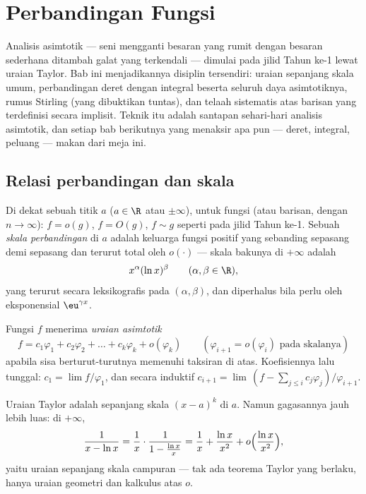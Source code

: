 \chapter{Perbandingan Fungsi}\label{ch:b2:comparison}

Analisis asimtotik --- seni mengganti besaran yang rumit
dengan besaran sederhana ditambah galat yang terkendali --- dimulai pada
jilid Tahun ke-1 lewat uraian Taylor. Bab ini menjadikannya disiplin
tersendiri: uraian sepanjang skala umum, perbandingan deret dengan
integral beserta seluruh daya asimtotiknya, rumus Stirling (yang
dibuktikan tuntas), dan telaah sistematis atas barisan yang terdefinisi
secara implisit. Teknik itu adalah santapan sehari-hari analisis
asimtotik, dan setiap bab berikutnya yang menaksir apa pun ---
deret, integral, peluang --- makan dari meja ini.

\section{Relasi perbandingan dan skala}

\begin{definition}\label{def:b2:comparison:landau}
Di dekat sebuah titik $a$ ($a \in \R$ atau $\pm\infty$), untuk fungsi
(atau barisan, dengan $n \to \infty$): $f = o(g)$, $f = O(g)$, $f \sim g$
seperti pada jilid Tahun ke-1. Sebuah \emph{skala
perbandingan} di $a$ adalah keluarga fungsi
positif yang sebanding sepasang demi sepasang dan terurut total oleh
$o(\cdot)$ --- skala bakunya di $+\infty$ adalah
\[
x^{\alpha} (\ln x)^{\beta}
\qquad (\alpha, \beta \in \R),
\]
yang terurut secara leksikografis pada $(\alpha, \beta)$, dan diperhalus
bila perlu oleh eksponensial $\eu^{\gamma x}$.
\end{definition}

\begin{definition}\label{def:b2:comparison:expansion}
Fungsi $f$ menerima \emph{uraian asimtotik}
\[
f = c_1 \varphi_1 + c_2\varphi_2 + \dots + c_k \varphi_k +
o(\varphi_k)
\qquad (\varphi_{i+1} = o(\varphi_i) \text{ pada skalanya})
\]
apabila sisa berturut-turutnya memenuhi taksiran di atas.
Koefisiennya lalu tunggal: $c_1 = \lim f/\varphi_1$, dan
secara induktif $c_{i+1} = \lim\,(f - \sum_{j \leq i}
c_j\varphi_j)/\varphi_{i+1}$.
\end{definition}

\begin{example}
Uraian Taylor adalah  sepanjang skala $(x -
a)^k$ di $a$. Namun gagasannya jauh lebih luas: di $+\infty$,
\[
\frac{1}{x - \ln x}
= \frac1x \cdot \frac{1}{1 - \frac{\ln x}{x}}
= \frac1x + \frac{\ln x}{x^2} + o\Bigl(\frac{\ln x}{x^2}\Bigr),
\]
yaitu uraian sepanjang skala campuran --- tak ada teorema Taylor yang
berlaku, hanya uraian geometri dan kalkulus atas $o$.
\end{example}


